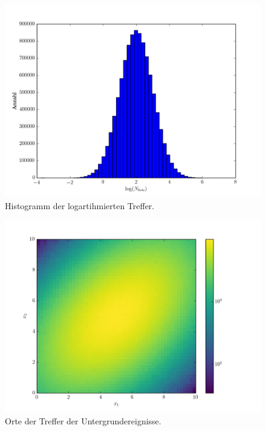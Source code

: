 \begin{figure}[htbp]
	\centering
	\includegraphics[width=1\textwidth]{N_hits_log.png}
	\caption{Histogramm der logartihmierten Treffer.}
\end{figure}


\begin{figure}[htbp]
	\centering
	\includegraphics[width=1\textwidth]{x1_x2_hist.png}
	\caption{Orte der Treffer der Untergrundereignisse.}
\end{figure}
